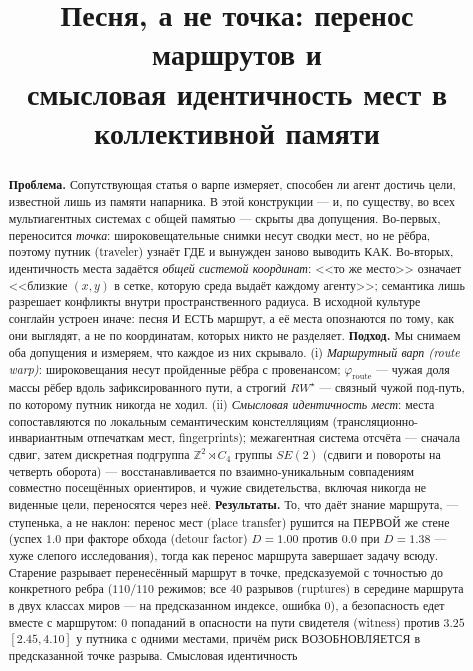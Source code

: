 \documentclass{article}
\title{Песня, а не точка: перенос маршрутов и\\смысловая идентичность мест в коллективной памяти}
\newcommand{\rwstar}{RW^{\star}}
\newcommand{\phiroute}{\varphi_{\mathrm{route}}}
\begin{document}
\maketitle

\begin{abstract}
\textbf{Проблема.} Сопутствующая статья о варпе измеряет, способен ли
агент достичь цели, известной лишь из памяти напарника. В этой
конструкции --- и, по существу, во всех мультиагентных системах с общей
памятью --- скрыты два допущения. Во-первых, переносится \emph{точка}:
широковещательные снимки несут сводки мест, но не рёбра, поэтому путник
(traveler) узнаёт ГДЕ и вынужден заново выводить КАК. Во-вторых,
идентичность места задаётся \emph{общей системой координат}: <<то же
место>> означает <<близкие $(x,y)$ в сетке, которую среда выдаёт каждому
агенту>>; семантика лишь разрешает конфликты внутри пространственного
радиуса. В исходной культуре сонглайн устроен иначе: песня И ЕСТЬ
маршрут, а её места опознаются по тому, как они выглядят, а не по
координатам, которых никто не разделяет.
\textbf{Подход.} Мы снимаем оба допущения и измеряем, что каждое из них
скрывало. (i) \emph{Маршрутный варп (route warp)}: широковещания несут
пройденные рёбра с провенансом; $\phiroute$ --- чужая доля массы рёбер
вдоль зафиксированного пути, а строгий $\rwstar$ --- связный чужой
под-путь, по которому путник никогда не ходил. (ii) \emph{Смысловая
идентичность мест}: места сопоставляются по локальным семантическим
констелляциям (трансляционно-инвариантным отпечаткам мест,
fingerprints); межагентная система отсчёта --- сначала сдвиг, затем
дискретная подгруппа $\mathbb{Z}^2\rtimes C_4$ группы $SE(2)$ (сдвиги и повороты на четверть оборота) --- восстанавливается по взаимно-уникальным
совпадениям совместно посещённых ориентиров, и чужие свидетельства,
включая никогда не виденные цели, переносятся через неё.
\textbf{Результаты.} То, что даёт знание маршрута, --- ступенька, а не
наклон: перенос мест (place transfer) рушится на ПЕРВОЙ же стене (успех
$1.0$ при факторе обхода (detour factor) $D{=}1.00$ против $0.0$ при
$D{=}1.38$ --- хуже слепого исследования), тогда как перенос маршрута
завершает задачу всюду. Старение разрывает перенесённый маршрут в точке,
предсказуемой с точностью до конкретного ребра ($110/110$ режимов; все
$40$ разрывов (ruptures) в середине маршрута в двух классах миров --- на
предсказанном индексе, ошибка $0$), а безопасность едет вместе с
маршрутом: $0$ попаданий в опасности на пути свидетеля (witness) против
$3.25$ $[2.45,4.10]$ у путника с одними местами, причём риск
ВОЗОБНОВЛЯЕТСЯ в предсказанной точке разрыва. Смысловая идентичность

\end{abstract}
\end{document}
